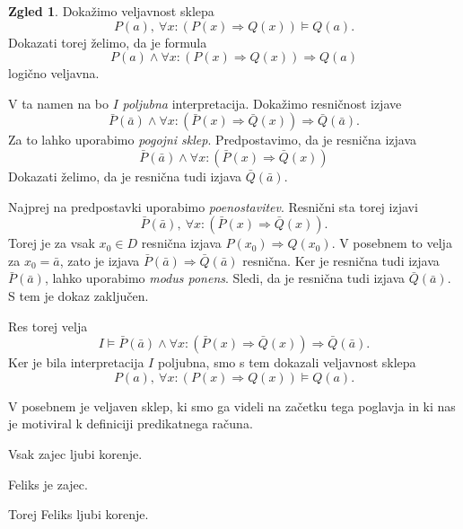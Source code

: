 \documentclass[11pt]{book}
\theoremstyle{definition}
\theoremstyle{zgled}
\newtheorem*{zgled}{Zgled}
\theoremstyle{odprtproblem}
\theoremstyle{domacanaloga}
\theoremstyle{izrek}
\begin{document}
\begin{zgled}
Dokažimo veljavnost sklepa
\[
    P(a), \ \forall x \colon (P(x) \Rightarrow Q(x)) \models Q(a).
\]
Dokazati torej želimo, da je formula
\[
    P(a) \land \forall x \colon (P(x) \Rightarrow Q(x)) \Rightarrow Q(a)
\]
logično veljavna. 

V ta namen na bo $I$ \emph{poljubna} interpretacija. Dokažimo resničnost izjave
\[
    \bar P( \bar a) \land \forall x \colon (\bar P(x) \Rightarrow \bar Q(x)) \Rightarrow \bar Q(\bar a).
\]
Za to lahko uporabimo \emph{pogojni sklep}. Predpostavimo, da je resnična izjava
\[
    \bar P( \bar a) \land \forall x \colon (\bar P(x) \Rightarrow \bar Q(x)) 
\]
Dokazati želimo, da je resnična tudi izjava $\bar Q(\bar a)$. 

Najprej na predpostavki uporabimo \emph{poenostavitev}. Resnični sta torej izjavi
\[
    \bar P( \bar a), \ \forall x \colon (\bar P(x) \Rightarrow \bar Q(x)).
\] 
Torej je za vsak $x_0 \in D$ resnična izjava $P(x_0) \Rightarrow Q(x_0)$. V posebnem to velja za $x_0 = \bar a$, zato je izjava $\bar P(\bar a) \Rightarrow \bar Q(\bar a)$ resnična. Ker je resnična tudi izjava $\bar P( \bar a)$, lahko uporabimo \emph{modus ponens}. Sledi, da je resnična tudi izjava $\bar Q(\bar a)$. S tem je dokaz zaključen. 

Res torej velja
\[
    I \models \bar P( \bar a) \land \forall x \colon (\bar P(x) \Rightarrow \bar Q(x)) \Rightarrow \bar Q(\bar a).
\]
Ker je bila interpretacija $I$ poljubna, smo s tem dokazali veljavnost sklepa
\[
    P(a), \ \forall x \colon (P(x) \Rightarrow Q(x)) \models Q(a).
\]

V posebnem je veljaven sklep, ki smo ga videli na začetku tega poglavja in ki nas je motiviral k definiciji predikatnega računa.

\begin{description}
    \item Vsak zajec ljubi korenje.
    \item Feliks je zajec.
    \item Torej Feliks ljubi korenje.
\end{description}
\end{zgled}
\end{document}
